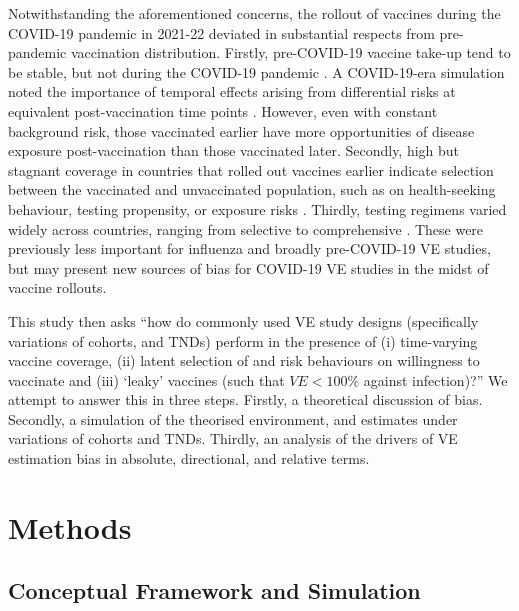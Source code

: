 \documentclass[12pt]{article}
\begin{document}
Notwithstanding the aforementioned concerns, the rollout of vaccines during the COVID-19 pandemic in 2021-22 deviated in substantial respects from pre-pandemic vaccination distribution. Firstly, pre-COVID-19 vaccine take-up tend to be stable, but not during the COVID-19 pandemic \citep{ritchie2020coronavirus}. A COVID-19-era simulation noted the importance of temporal effects arising from differential risks at equivalent post-vaccination time points \citep{lewnard2021theoretical}. However, even with constant background risk, those vaccinated earlier have more opportunities of disease exposure post-vaccination than those vaccinated later. Secondly, high but stagnant coverage in countries that rolled out vaccines earlier indicate selection between the vaccinated and unvaccinated population, such as on health-seeking behaviour, testing propensity, or exposure risks \citep{ritchie2020coronavirus}. Thirdly, testing regimens varied widely across countries, ranging from selective to comprehensive \citep{ritchie2020coronavirus}. These were previously less important for influenza and broadly pre-COVID-19 VE studies, but may present new sources of bias for COVID-19 VE studies in the midst of vaccine rollouts.

This study then asks ``how do commonly used VE study designs (specifically variations of cohorts, and TNDs) perform in the presence of (i) time-varying vaccine coverage, (ii) latent selection of and risk behaviours on willingness to vaccinate and (iii) `leaky' vaccines (such that $VE < 100\%$ against infection)?'' We attempt to answer this in three steps. Firstly, a theoretical discussion of bias. Secondly, a simulation of the theorised environment, and estimates under variations of cohorts and TNDs. Thirdly, an analysis of the drivers of VE estimation bias in absolute, directional, and relative terms.

\section{Methods}
\subsection{Conceptual Framework and Simulation}
\end{document}
